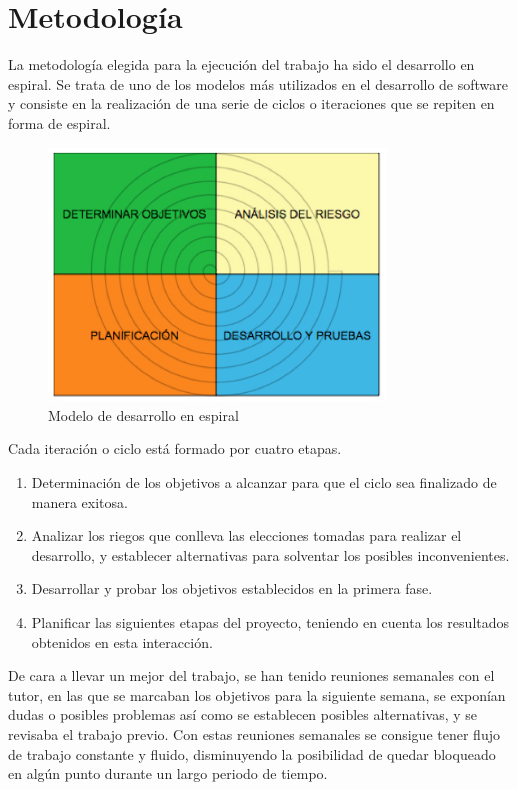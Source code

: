 \section{Metodología}
La metodología elegida para la ejecución del trabajo ha sido el desarrollo en espiral. Se trata de uno de los modelos más utilizados en el desarrollo de software y consiste en la realización de una serie de ciclos o iteraciones que se repiten en forma de espiral.
\begin{figure}[H]
  \begin{center}
    \includegraphics[width=0.8\textwidth]{figures/desarrolloespiral.png}
		\caption{Modelo de desarrollo en espiral}
		\label{fig.desarrolloespiral}
		\end{center}
\end{figure}
Cada iteración o ciclo está formado por cuatro etapas.
\begin{enumerate}
\item Determinación de los objetivos a alcanzar para que el ciclo sea finalizado de manera exitosa.
\item Analizar los riegos que conlleva las elecciones tomadas para realizar el desarrollo, y establecer alternativas para solventar los posibles inconvenientes.
\item Desarrollar y probar los objetivos establecidos en la primera fase.
\item Planificar las siguientes etapas del proyecto, teniendo en cuenta los resultados obtenidos en esta interacción.
\end{enumerate}
De cara a llevar un mejor del trabajo, se han tenido reuniones semanales con el tutor, en las que se marcaban los objetivos para la siguiente semana, se exponían dudas o posibles problemas  así como se establecen posibles alternativas, y se revisaba el trabajo previo. Con estas reuniones semanales se consigue tener flujo de trabajo constante y fluido, disminuyendo la posibilidad de quedar bloqueado en algún punto durante un largo periodo de tiempo.

